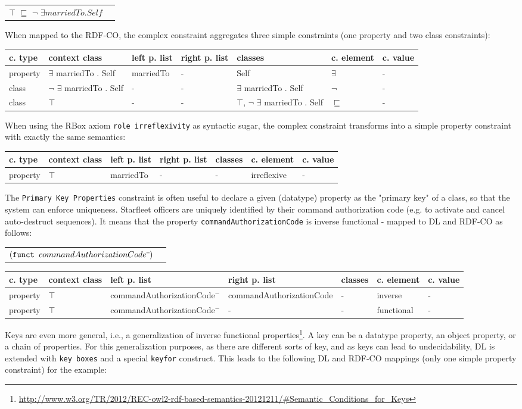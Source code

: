 \documentclass{llncs}
\newcommand{\ms}[1]{\texttt{#1}}
\newenvironment{gcotable}{
  \scriptsize
  \sffamily
  \vspace{0.3cm}
	\begin{center}
  \begin{tabular}{l|l|l|l|l|l|l}
  \hline
  \textbf{c. type} & \textbf{context class} & \textbf{left p. list} & \textbf{right p. list} & \textbf{classes} & \textbf{c. element} & \textbf{c. value} \\
  \hline

}{
  \hline
  \end{tabular}
	\end{center}
}
\newenvironment{DL}{
  \vspace{0.3cm}
	\begin{center}
  \begin{tabular}{r l}

}{
  \end{tabular}
	\end{center}
}
\begin{document}
\begin{DL}
$\top$ $\sqsubseteq$ $\neg$ $\exists  marriedTo . Self$
\end{DL}

When mapped to the RDF-CO, the complex constraint aggregates three simple constraints (one property and two class constraints):

\begin{gcotable}
property & $\exists$ marriedTo . Self & marriedTo & - & Self & $\exists$ & - \\
class & $\neg$ $\exists$ marriedTo . Self & - & - & $\exists$ marriedTo . Self & $\neg$ & - \\
class & $\top$ & - & - & $\top$, $\neg$ $\exists$ marriedTo . Self & $\sqsubseteq$ & - \\
\end{gcotable}

When using the RBox axiom \ms{role irreflexivity} as syntactic sugar, 
the complex constraint transforms into a simple property constraint with exactly the same semantics:

\begin{gcotable}
property & $\top$ & marriedTo & - & - & irreflexive & - \\
\end{gcotable}

The \ms{Primary Key Properties} constraint is often useful to declare a given (datatype) property as the "primary key" of a class, so that the system can enforce uniqueness. 
Starfleet officers are uniquely identified by their command authorization code (e.g. to activate and cancel auto-destruct sequences).
It means that the property \ms{commandAuthorizationCode} is inverse functional - mapped to DL and RDF-CO as follows:

\begin{DL}
$(\ms{funct } commandAuthorizationCode\sp{\overline{\ }})$
\end{DL}

\begin{gcotable}
property & $\top$ & commandAuthorizationCode$^{-}$ & commandAuthorizationCode & - & inverse & - \\
property & $\top$ & commandAuthorizationCode$^{-}$ & - & - & functional & - \\
\end{gcotable}

Keys are even more general, i.e., a generalization of inverse functional properties\footnote{\url{http://www.w3.org/TR/2012/REC-owl2-rdf-based-semantics-20121211/#Semantic_Conditions_for_Keys}}.
A key can be a datatype property, an object property, or a chain of properties.
For this generalization purposes, as there are different sorts of key, and as keys can lead to undecidability, 
DL is extended with \ms{key boxes} and a special \ms{keyfor} construct\cite{Lutz2005}.
This leads to the following DL and RDF-CO mappings (only one simple property constraint) for the example:
\end{document}
